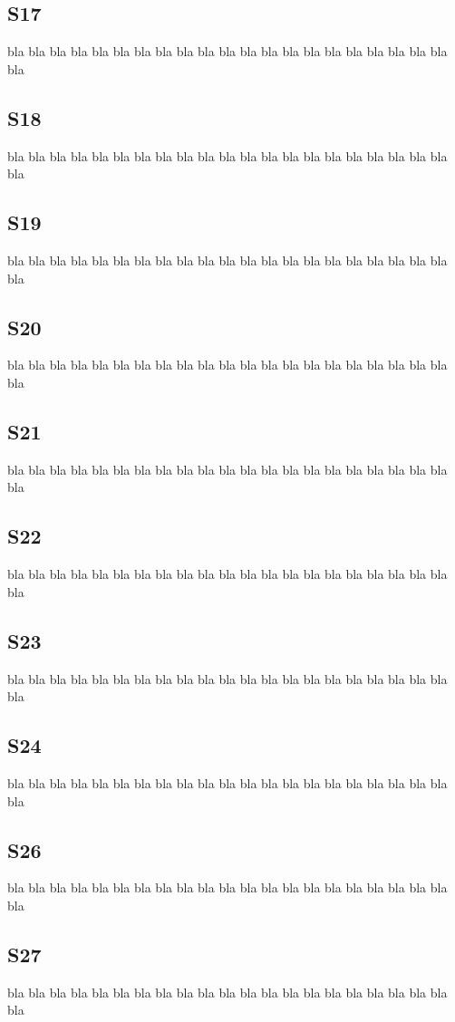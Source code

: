 \documentclass[12pt,a4paper]{article}
\begin{document}
\subsection{S17}
bla bla bla bla bla bla bla bla bla bla bla
bla bla bla bla bla bla bla bla bla bla bla
\subsection{S18}
bla bla bla bla bla bla bla bla bla bla bla
bla bla bla bla bla bla bla bla bla bla bla
\subsection{S19}
bla bla bla bla bla bla bla bla bla bla bla
bla bla bla bla bla bla bla bla bla bla bla
\subsection{S20}
bla bla bla bla bla bla bla bla bla bla bla
bla bla bla bla bla bla bla bla bla bla bla
\subsection{S21}
bla bla bla bla bla bla bla bla bla bla bla
bla bla bla bla bla bla bla bla bla bla bla
\subsection{S22}
bla bla bla bla bla bla bla bla bla bla bla
bla bla bla bla bla bla bla bla bla bla bla
\subsection{S23}
bla bla bla bla bla bla bla bla bla bla bla
bla bla bla bla bla bla bla bla bla bla bla
\subsection{S24}
bla bla bla bla bla bla bla bla bla bla bla
bla bla bla bla bla bla bla bla bla bla bla
\subsection{S26}
bla bla bla bla bla bla bla bla bla bla bla
bla bla bla bla bla bla bla bla bla bla bla
\subsection{S27}
bla bla bla bla bla bla bla bla bla bla bla
bla bla bla bla bla bla bla bla bla bla bla
\end{document}
